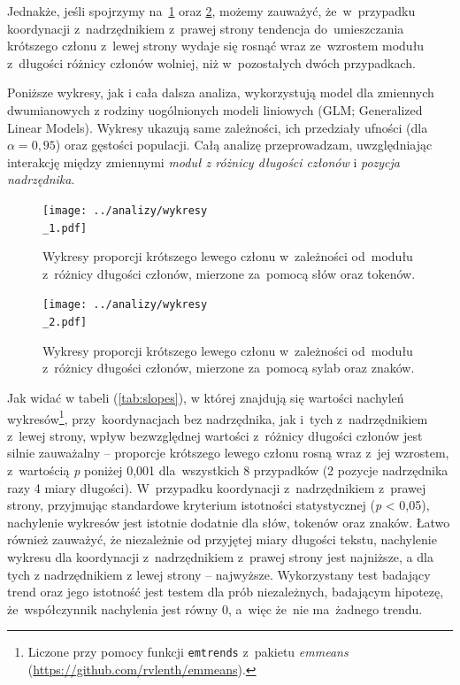 \documentclass[licencjacka]{pracamgr_Kogni}
\begin{document}
Jednakże, jeśli spojrzymy na~\ref{wykresy} oraz \ref{wykresy2}, możemy zauważyć, że~w~przypadku koordynacji z~nadrzędnikiem z~prawej strony tendencja do~umieszczania krótszego członu z~lewej strony wydaje się rosnąć wraz ze~wzrostem modułu z~długości różnicy członów wolniej, niż w~pozostałych dwóch przypadkach. 

Poniższe wykresy, jak i cała dalsza analiza, wykorzystują model dla zmiennych dwumianowych z rodziny uogólnionych modeli liniowych (GLM; Generalized Linear Models). Wykresy ukazują same zależności, ich przedziały ufności (dla $\alpha = 0,95$) oraz gęstości populacji.
Całą analizę przeprowadzam, uwzględniając interakcję między zmiennymi \textit{moduł z różnicy długości członów} i \textit{pozycja nadrzędnika}.

\begin{figure}
    \centering
    \texttt{[image: ../analizy/wykresy\\\_1.pdf]}
    \caption[b]{Wykresy proporcji krótszego lewego członu w~zależności od~modułu z~różnicy długości członów, mierzone za~pomocą słów oraz tokenów.}
    \label{wykresy}
\end{figure}
\begin{figure}
    \centering
    \texttt{[image: ../analizy/wykresy\\\_2.pdf]}
    \caption[b]{Wykresy proporcji krótszego lewego członu w~zależności od~modułu z~różnicy długości członów, mierzone za~pomocą sylab oraz znaków.}
    \label{wykresy2}
\end{figure}
\newpage

Jak widać w tabeli (\ref{tab:slopes}), w której znajdują się wartości nachyleń wykresów\footnote{Liczone przy pomocy funkcji \texttt{emtrends} z~pakietu \textit{emmeans} (\url{https://github.com/rvlenth/emmeans}).}, przy~koordynacjach bez nadrzędnika, jak i~tych z~nadrzędnikiem z~lewej strony, wpływ bezwzględnej wartości z~różnicy długości członów jest silnie zauważalny -- proporcje krótszego lewego członu rosną wraz z~jej wzrostem, z~wartością \textit{p} poniżej 0,001 dla~wszystkich 8 przypadków (2 pozycje nadrzędnika razy 4 miary długości). 
W~przypadku koordynacji z~nadrzędnikiem z~prawej strony, przyjmując standardowe kryterium istotności statystycznej (\textit{p} < 0,05), nachylenie wykresów jest istotnie dodatnie dla słów, tokenów oraz znaków.
Łatwo również zauważyć, że niezależnie od przyjętej miary długości tekstu, nachylenie wykresu dla koordynacji z~nadrzędnikiem z~prawej strony jest najniższe, a dla tych z nadrzędnikiem z lewej strony -- najwyższe.
Wykorzystany test badający trend oraz jego istotność jest testem dla prób niezależnych, badającym hipotezę, że~współczynnik nachylenia jest równy 0, a~więc że~nie ma~żadnego trendu.
\end{document}
